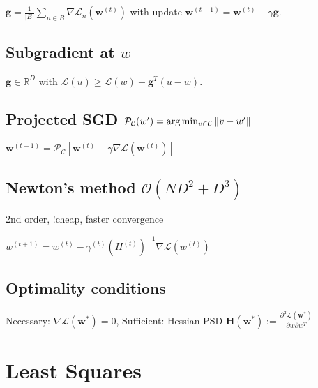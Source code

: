 $\mathbf{g} = \frac{1}{|B|} \sum_{n\in B}{\nabla \mathcal{L}}_n(\mathbf{w}^{(t)})$ with update \newline $\mathbf{w}^{(t+1)} = \mathbf{w}^{(t)} - \gamma \mathbf{g}$.

\subsection{Subgradient at $w$}

$\mathbf{g} \in \mathbb{R}^D$ with $\mathcal{L}(u) \ge \mathcal{L}(w) + \mathbf{g}^T (u-w)$. 


\subsection{Projected SGD $\mathcal{P_C}(w')=\arg\min_{v\in\mathcal{C}}\left\lVert v-w'\right\rVert$}

$\mathbf{w}^{(t+1)} = \mathcal{P_C} [\mathbf{w}^{(t)} - \gamma \nabla \mathcal{L}(\mathbf{w}^{(t)})]$

\subsection{Newton's method $\mathcal{O}(ND^2 + D^3)$}\label{Newton}
2nd order, !cheap, faster convergence

$w^{(t+1)} = w^{(t)} - \gamma^{(t)} (H^{(t)})^{-1} \nabla \mathcal{L}(w^{(t)})$

\subsection{Optimality conditions}
Necessary: $\nabla \mathcal{L} (\mathbf{w}^*) = 0$,
Sufficient: Hessian PSD $\mathbf{H}(\mathbf{w}^*) := \frac{\partial^2 \mathcal{L}(\mathbf{w}^*)}{\partial w \partial w^T}$
\newline

\section{Least Squares}
